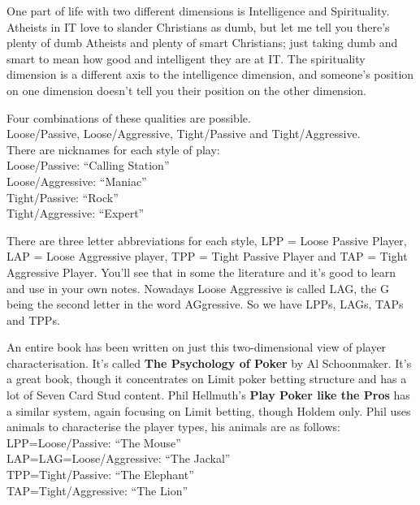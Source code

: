 One part of life with two different dimensions is Intelligence and
Spirituality. Atheists in IT love to slander Christians as dumb,
but let me tell you there's plenty of dumb Atheists and plenty of
smart Christians; just taking dumb and smart to mean how good and
intelligent they are at IT. The spirituality dimension is a different
axis to the intelligence dimension, and someone's position on one
dimension doesn't tell you their position on the other dimension.


Four combinations of these qualities are possible. \\
Loose/Passive, Loose/Aggressive, Tight/Passive and Tight/Aggressive. \\
There are nicknames for each style of play: \\
Loose/Passive: ``Calling Station'' \\
Loose/Aggressive: ``Maniac'' \\
Tight/Passive: ``Rock'' \\
Tight/Aggressive: ``Expert''

There are three letter abbreviations for each style, LPP = Loose
Passive Player, LAP = Loose Aggressive player, TPP = Tight Passive
Player and TAP = Tight Aggressive Player. You'll see that in some the
literature and it's good to learn and use in your own notes. Nowadays
Loose Aggressive is called LAG, the G being the second letter in the
word AGgressive. So we have LPPs, LAGs, TAPs and TPPs.


An entire book has been written on just this two-dimensional view
of player characterisation. It's called \textbf{The Psychology of Poker}
by Al Schoonmaker. It's a great book, though it concentrates
on Limit poker betting structure and has a lot of Seven Card Stud
content. Phil Hellmuth's \textbf{Play Poker like the Pros} has a
similar system, again focusing on Limit betting, though Holdem only.
Phil uses animals to characterise the player types, his animals are
as follows: \\
LPP=Loose/Passive: ``The Mouse'' \\
LAP=LAG=Loose/Aggressive: ``The Jackal'' \\
TPP=Tight/Passive: ``The Elephant'' \\
TAP=Tight/Aggressive: ``The Lion''


